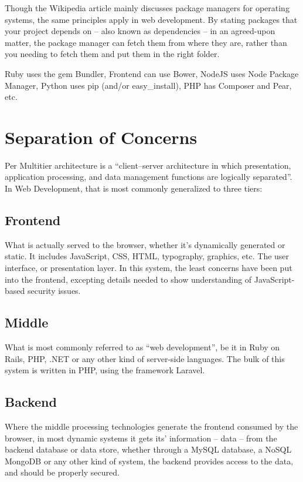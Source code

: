 Though the Wikipedia article mainly discusses package managers for operating systems, the same principles apply in web development. By stating packages that your project depends on -- also known as dependencies -- in an agreed-upon matter, the package manager can fetch them from where they are, rather than you needing to fetch them and put them in the right folder.

Ruby uses the gem Bundler, Frontend can use Bower, NodeJS uses Node Package Manager, Python uses pip (and/or easy\_install), PHP has Composer and Pear, etc.

\section{Separation of Concerns}
\label{sec:architecture}
\noindent
Per \citep{Wikipedia2013ma} Multitier architecture is a ``client–server architecture in which presentation, application processing, and data management functions are logically separated''. In Web Development, that is most commonly generalized to three tiers:

\subsection{Frontend}
\noindent
What is actually served to the browser, whether it's dynamically generated or static. It includes JavaScript, CSS, HTML, typography, graphics, etc. The user interface, or presentation layer. In this system, the least concerns have been put into the frontend, excepting details needed to show understanding of JavaScript-based security issues.

\subsection{Middle}
\noindent
What is most commonly referred to as ``web development'', be it in Ruby on Rails, PHP,
.NET or any other kind of server-side languages. The bulk of this system is written in PHP,
using the framework Laravel.

\subsection{Backend}
\noindent
Where the middle processing technologies generate the frontend consumed by the browser, in most dynamic systems it gets its' information -- data -- from the backend database or data store, whether through a MySQL database, a NoSQL MongoDB or any other kind of system, the backend provides access to the data, and should be properly secured.


